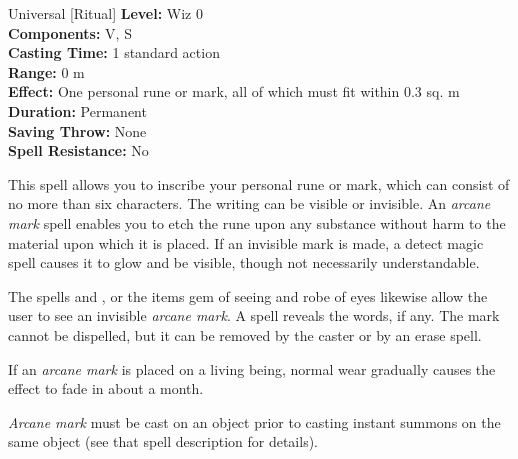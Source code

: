 {Universal [Ritual]}
{
	\textbf{Level:}
	Wiz 0\\
	\textbf{Components:}
	V, S\\
	\textbf{Casting Time:}
	1 standard action\\
	\textbf{Range:}
	0 m\\
	\textbf{Effect:}
	One personal rune or mark, all of which must fit within 0.3 sq. m\\
	\textbf{Duration:}
	Permanent\\
	\textbf{Saving Throw:}
	None\\
	\textbf{Spell Resistance:}
	No\\
}
{
	This spell allows you to inscribe your personal rune or mark, which can consist of no more than six characters. The writing can be visible or invisible. An \emph{arcane mark} spell enables you to etch the rune upon any substance without harm to the material upon which it is placed. If an invisible mark is made, a detect magic spell causes it to glow and be visible, though not necessarily understandable.

	The spells  and , or the items gem of seeing and robe of eyes likewise allow the user to see an invisible \emph{arcane mark}. A  spell reveals the words, if any. The mark cannot be dispelled, but it can be removed by the caster or by an erase spell.

	If an \emph{arcane mark} is placed on a living being, normal wear gradually causes the effect to fade in about a month.

	\emph{Arcane mark} must be cast on an object prior to casting instant summons on the same object (see that spell description for details).

}
